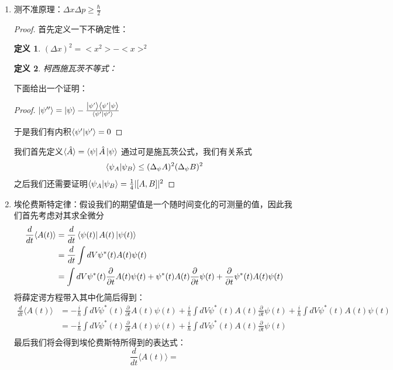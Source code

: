 \documentclass{article}
\newtheorem{definition}{定义}
\begin{document}
\begin{enumerate}
    \item 测不准原理：$\Delta x\Delta p\geqslant  \frac{\hbar}{2}$
    \begin{proof}
        首先定义一下不确定性：
        \begin{definition}
            $(\Delta x)^2=<x^2>-<x>^2$
        \end{definition}
        \begin{definition}
            柯西施瓦茨不等式：
            \[\]
        \end{definition}
        下面给出一个证明：
        \begin{proof}
            $\ket{\psi^{\prime\prime}}=\ket{\psi}-\frac{\ket{\psi^\prime}\braket{\psi^\prime}{\psi}}{\braket{\psi^\prime}{\psi^\prime}}$
            
            于是我们有内积$\braket{\psi^\prime}{\psi^{\prime}}=0$
        \end{proof}
        我们首先定义$\langle\hat{A}\rangle=\bra{\psi}\hat{A}\ket{\psi}$
        通过可是施瓦茨公式，我们有关系式
        \[\braket{\psi_A}{\psi_B}\leq(\Delta_\psi A)^2(\Delta_\psi B)^2\]
        之后我们还需要证明$\braket{\psi_A}{\psi_B}=\frac{1}{4}|[A,B]|^2$
    \end{proof}
    \item 埃伦费斯特定律：假设我们的期望值是一个随时间变化的可测量的值，因此我们首先考虑对其求全微分
    \begin{align*}
        \frac{d}{dt}\langle A(t)\rangle&=\frac{d}{dt}\bra{\psi(t)}A(t)\ket{\psi(t)}\\
        &=\frac{d}{dt}\int dV \psi^*(t)A(t)\psi(t)\\
        &=\int dV\psi^*(t)\frac{\partial}{\partial t}A(t)\psi(t) + \psi^*(t)A(t)\frac{\partial}{\partial t}\psi(t) + \frac{\partial}{\partial t}\psi^*(t)A(t)\psi(t)
    \end{align*}
    将薛定谔方程带入其中化简后得到：
    \begin{align*}
        \frac{d}{dt}\langle A(t)\rangle&=-\frac{i}{\hbar}\int dV\psi^*(t)\frac{\partial}{\partial t}A(t)\psi(t) + \frac{i}{\hbar}\int dV\psi^*(t)A(t)\frac{\partial}{\partial t}\psi(t) + \frac{i}{\hbar}\int dV\psi^*(t)A(t)\psi(t)\\
        &=-\frac{i}{\hbar}\int dV\psi^*(t)\frac{\partial}{\partial t}A(t)\psi(t) + \frac{i}{\hbar}\int dV\psi^*(t)A(t)\frac{\partial}{\partial t}\psi(t)\\
    \end{align*}
    最后我们将会得到埃伦费斯特所得到的表达式：
    \[
    \frac{d}{dt}\langle A(t)\rangle=
\]
\end{enumerate}
\end{document}
